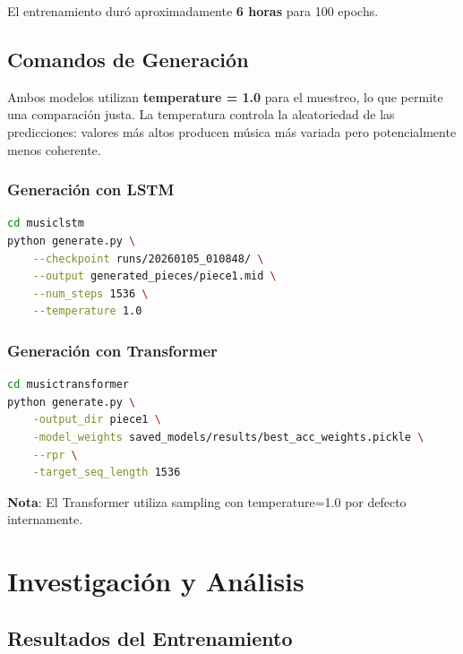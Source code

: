 \documentclass[12pt,a4paper]{article}
\begin{document}
El entrenamiento duró aproximadamente \textbf{6 horas} para 100 epochs.

\subsection{Comandos de Generación}

Ambos modelos utilizan \textbf{temperature = 1.0} para el muestreo, lo que permite una comparación justa. La temperatura controla la aleatoriedad de las predicciones: valores más altos producen música más variada pero potencialmente menos coherente.

\subsubsection{Generación con LSTM}
\begin{lstlisting}[language=bash]
cd musiclstm
python generate.py \
    --checkpoint runs/20260105_010848/ \
    --output generated_pieces/piece1.mid \
    --num_steps 1536 \
    --temperature 1.0
\end{lstlisting}

\subsubsection{Generación con Transformer}
\begin{lstlisting}[language=bash]
cd musictransformer
python generate.py \
    -output_dir piece1 \
    -model_weights saved_models/results/best_acc_weights.pickle \
    --rpr \
    -target_seq_length 1536
\end{lstlisting}

\textbf{Nota}: El Transformer utiliza sampling con temperature=1.0 por defecto internamente.

\section{Investigación y Análisis}

\subsection{Resultados del Entrenamiento}
\end{document}
